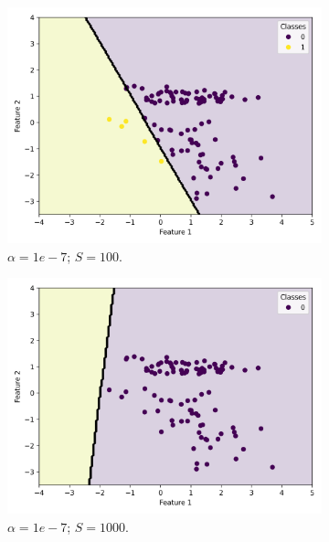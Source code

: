 \documentclass{article}
\begin{document}
\begin{figure}
  \centering
  \begin{subfigure}[t]{0.24\textwidth}
    \centering
    \includegraphics[width=\linewidth]{scatter_predictions_with_contour_3_learning_rate_1_sample_100.png}
    \caption{$\alpha = 1e-7$; $S = 100$.}
  \end{subfigure}
  \hfill
  \begin{subfigure}[t]{0.24\textwidth}
    \centering
    \includegraphics[width=\linewidth]{scatter_predictions_with_contour_3_learning_rate_1_sample_1000.png}
    \caption{$\alpha = 1e-7$; $S = 1000$.}
  \end{subfigure}
  \hfill
  \begin{subfigure}[t]{0.24\textwidth}

\end{subfigure}
\end{figure}
\end{document}
